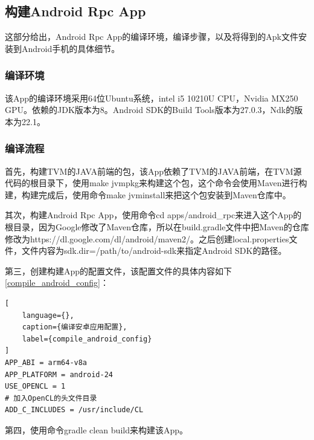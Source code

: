 \subsection{构建Android Rpc App}

这部分给出，Android Rpc App的编译环境，编译步骤，以及将得到的Apk文件安装到Android手机的具体细节。


\subsubsection{编译环境}

该App的编译环境采用64位Ubuntu系统，intel i5 10210U CPU，Nvidia MX250 GPU。依赖的JDK版本为8。Android SDK的Build Tools版本为27.0.3，Ndk的版本为22.1。

\subsubsection{编译流程}

首先，构建TVM的JAVA前端的包，该App依赖了TVM的JAVA前端，在TVM源代码的根目录下，使用make jvmpkg来构建这个包，这个命令会使用Maven进行构建，构建完成后，使用命令make jvminstall来把这个包安装到Maven仓库中。

其次，构建Android Rpc App，使用命令cd apps/android\_rpc来进入这个App的根目录，因为Google修改了Maven仓库，所以在build.gradle文件中把Maven的仓库修改为https://dl.google.com/dl/android/maven2/。之后创建local.properties文件，文件内容为sdk.dir=/path/to/android-sdk来指定Android SDK的路径。

第三，创建构建App的配置文件，该配置文件的具体内容如下\ref{compile_android_config}：

\begin{lstlisting}[
    language={},
    caption={编译安卓应用配置},
    label={compile_android_config}
]
APP_ABI = arm64-v8a
APP_PLATFORM = android-24
USE_OPENCL = 1
# 加入OpenCL的头文件目录
ADD_C_INCLUDES = /usr/include/CL
\end{lstlisting}

第四，使用命令gradle clean build来构建该App。

